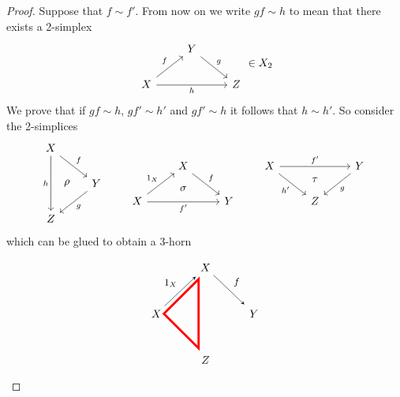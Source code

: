 \begin{proof}
    Suppose that $f \sim f'$. 
    From now on we write $gf \sim h$ to mean that there exists a 2-simplex
    \[
    \begin{tikzcd}
        &
        Y
        \arrow[rd,"g"]
        &\\
        X
        \arrow[ru, "f"]
        \arrow[rr,"h"']
        &
        &
        Z
    \end{tikzcd}   
    \in X_2
    \]
    We prove that if $gf \sim h$, $gf' \sim h'$ and $gf' \sim h$ it follows that $h \sim h'$. 
    So consider the 2-simplices
    \[
    \begin{tikzcd}
        X
        \ar[dd, phantom, shift left=6, "\rho"]
        \ar[dd,"h"']
        \ar[rd,"f"]
        &
        \\
        &
        Y
        \ar[ld,"g"]
        \\
        Z
    \end{tikzcd}
    \qquad
    \begin{tikzcd}
        &
        X
        \ar[rd, "f"]
        &
        \\
        X
        \ar[rr, phantom, shift left=5, "\sigma"]
        \ar[rr, "f'"']
        \ar[ru, "1_X"]
        &&
        Y
    \end{tikzcd}
    \qquad
    \begin{tikzcd}
        X
        \ar[rr, phantom, shift right=5, "\tau"]
        \ar[rr, "f'"]
        \ar[rd, "h'"']
        &&
        Y
        \arrow[ld, "g"]
        \\
        &
        Z
        &        
    \end{tikzcd}
    \]
    which can be glued to obtain a 3-horn
    \[
    \begin{tikzpicture}[>=stealth,->,shorten >=2pt,looseness=.5,auto]
            \matrix[anchor=center, column sep=1cm, row sep=1cm] at (0,0)
            {
                                & \node(X_1) {$X$};   &                 \\
             \node(X_0) {$X$};     &                  & \node(X_2) {$Y$};  \\
                                & \node(X_3) {$Z$};   &                 \\
            };
            \draw[line width=2pt,color=red] (-0.2,1.1) -- (-0.2,-1.1) -- (-1.3, 0) -- cycle;
            \begin{scope}[every node/.style={font=\small\itshape}]
                \draw (X_1) -- node [midway] {$f$} (X_2);
                \draw (X_0) -- node [midway] {$1_X$} (X_1);

\end{scope}
\end{tikzpicture}\]
\end{proof}
